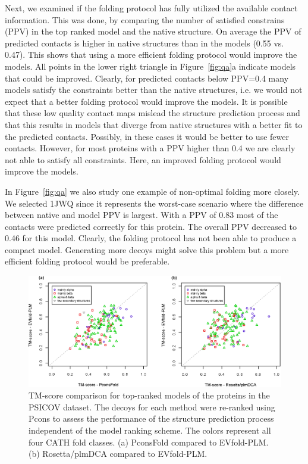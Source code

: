 \documentclass{bioinfo}
\begin{document}
Next, we examined if the folding protocol has fully utilized the
available contact information. This was done, by comparing the number
of satisfied constrains (PPV) in the top ranked model and the native
structure.  On average the PPV of predicted contacts is higher in
native structures than in the models (0.55 vs. 0.47). This shows that
using a more efficient folding protocol would improve the models. All
points in the lower right triangle in Figure~\ref{fig:qa}a indicate
models that could be improved.  Clearly, for predicted contacts below
PPV=0.4 many models satisfy the constraints better than the native
structures, i.e. we would not expect that a better folding protocol
would improve the models.  It is possible that these low quality
contact maps mislead the structure prediction process and that this
results in models that diverge from native structures with a better
fit to the predicted contacts. Possibly, in these cases it would be
better to use fewer contacts. 
However, for most proteins with a PPV higher than 0.4 we are
clearly not able to satisfy all constraints. Here, an improved folding
protocol would improve the models.


In Figure~\ref{fig:qa} we also study one example of non-optimal
folding more closely. We selected 1JWQ since it represents the
worst-case scenario where the difference between native and model PPV
is largest. With a PPV of 0.83 most of the contacts were predicted
correctly for this protein. The overall PPV decreased to 0.46 for this
model. Clearly, the folding protocol has not been able to produce a
compact model. Generating more decoys might solve this problem but a
more efficient folding protocol would be preferable.





\begin{figure}[!tpb]%
\centerline{\includegraphics[scale=0.7]{figures/vs.eps}}
\caption{TM-score comparison for top-ranked models of the proteins in
 the PSICOV dataset. The decoys for each method were re-ranked using
 Pcons to assess the performance of the structure prediction process
 independent of the model ranking scheme. The colors represent all
 four CATH fold classes. (a) PconsFold compared to EVfold-PLM. (b)
 Rosetta/plmDCA compared to EVfold-PLM.}\label{fig:vs}
\end{figure}
\end{document}
